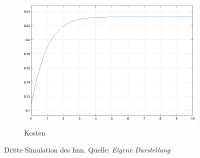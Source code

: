 \begin{figure}[h]
\begin{subfigure}[b]{0.32\textwidth}
    \includegraphics[width=\textwidth]{abbildungen/hnn_simulation_3_kostenfunktion.png}
    \caption{Kosten}
  \end{subfigure}
  \caption{Dritte Simulation des \ac{hnn}. Quelle: \textit{Eigene Darstellung}}
  \label{fig:Simulation HNN 3}
\end{figure}
